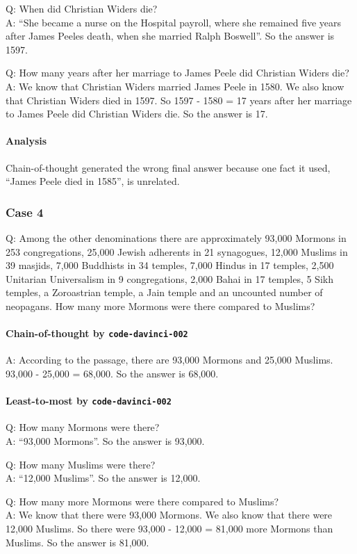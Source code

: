 Q: When did Christian Widers die?\\
A: ``She became a nurse on the Hospital payroll, where she remained five years after James Peeles death, when she married Ralph Boswell''. So the answer is 1597.

Q: How many years after her marriage to James Peele did Christian Widers die?\\
A: We know that Christian Widers married James Peele in 1580. We also know that Christian Widers died in 1597. So 1597 - 1580 = 17 years after her marriage to James Peele did Christian Widers die. So the answer is 17.

\paragraph{Analysis}
Chain-of-thought generated the wrong final answer because one fact it used, ``James Peele died in 1585'', is unrelated.

\subsubsection{Case 4}
Q: Among the other denominations there are approximately 93,000 Mormons in 253 congregations, 25,000 Jewish adherents in 21 synagogues, 12,000 Muslims in 39 masjids, 7,000 Buddhists in 34 temples, 7,000 Hindus in 17 temples, 2,500 Unitarian Universalism in 9 congregations, 2,000 Bahai in 17 temples, 5 Sikh temples, a Zoroastrian temple, a Jain temple and an uncounted number of neopagans. How many more Mormons were there compared to Muslims?

\paragraph{Chain-of-thought by \texttt{code-davinci-002}}
A: According to the passage, there are 93,000 Mormons and 25,000 Muslims. 93,000 - 25,000 = 68,000. So the answer is 68,000.

\paragraph{Least-to-most by \texttt{code-davinci-002}}
Q: How many Mormons were there?\\
A: ``93,000 Mormons''. So the answer is 93,000.

Q: How many Muslims were there?\\
A: ``12,000 Muslims''. So the answer is 12,000.

Q: How many more Mormons were there compared to Muslims?\\
A: We know that there were 93,000 Mormons. We also know that there were 12,000 Muslims. So there were 93,000 - 12,000 = 81,000 more Mormons than Muslims. So the answer is 81,000.

